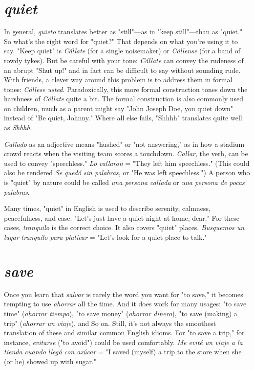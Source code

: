 \section{\emph{quiet}}

In general, \emph{quieto} translates better as "still"---as in "keep
still"---than as "quiet." So what's the right word for "quiet?" That
depends on what you're using it to say. "Keep quiet" is \emph{Cállate} (for
a single noisemaker) or \emph{Cállense} (for.a band of rowdy tykes). But be
careful with your tone: \emph{Cállate} can convey the rudeness of an abrupt
"Shut up!" and in fact can be difficult to say without sounding rude.
With friends, a clever way around this problem is to address them in
formal tones: \emph{Cállese usted}. Paradoxically, this more formal construction tones down the harshness of \emph{Cállate} quite a bit. The formal construction is also commonly used on children, much as a parent might
say "John Joseph Doe, you quiet down" instead of "Be quiet, Johnny."
Where all else fails, "Shhhh" translates quite well as \emph{Shhhh}.

\emph{Callado} as an adjective means "hushed" or "not answering,"
as in how a stadium crowd reacts when the visiting team scores a
touchdown. \emph{Callar}, the verb, can be used to convey "speechless." \emph{Lo
callaron} = "They left him speechless." (This could also be rendered
\emph{Se quedó sin palabras}, or "He was left speechless.") A person who is
"quiet" by nature could be called \emph{una persona callada} or \emph{una persona de pocas palabras}.

Many times, "quiet" in English is used to describe serenity,
calmness, peacefulness, and ease: "Let's just have a quiet night at
home, dear." For these cases, \emph{tranquilo} is the correct choice. It also
covers "quiet" places. \emph{Busquemos un lugar tranquilo para platicar} =
"Let's look for a quiet place to talk."

\section{\emph{save}}

Once you learn that \emph{salvar} is rarely the word you want for "to
save," it becomes tempting to use \emph{ahorrar} all the time. And it does
work for many usages: "to save time" (\emph{ahorrar tiempo}), "to save
money" (\emph{ahorrar dinero}), "to save (making) a trip" (\emph{ahorrar un viaje}),
and So on. Still, it's not always the smoothest translation of these and
similar common English idioms. For "to save a trip," for instance, \emph{evitarse} ("to avoid") could be used comfortably. \emph{Me evité un viaje a la
tienda cuando llegó con azúcar} = "I saved (myself) a trip to the store
when she (or he) showed up with sugar."

